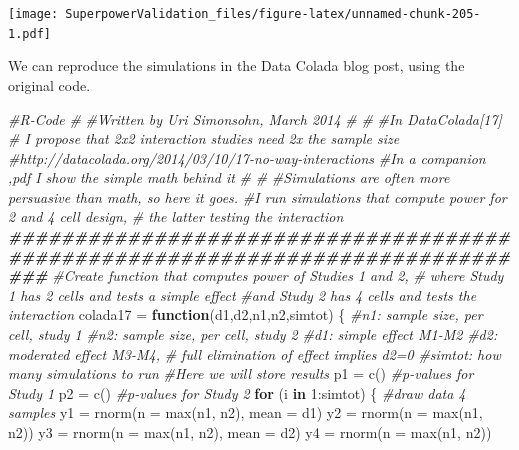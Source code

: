 \documentclass[
]{book}
\newenvironment{Shaded}{\begin{snugshade}}{\end{snugshade}}
\newcommand{\AttributeTok}[1]{\textcolor[rgb]{0.77,0.63,0.00}{#1}}
\newcommand{\CommentTok}[1]{\textcolor[rgb]{0.56,0.35,0.01}{\textit{#1}}}
\newcommand{\ControlFlowTok}[1]{\textcolor[rgb]{0.13,0.29,0.53}{\textbf{#1}}}
\newcommand{\DecValTok}[1]{\textcolor[rgb]{0.00,0.00,0.81}{#1}}
\newcommand{\DocumentationTok}[1]{\textcolor[rgb]{0.56,0.35,0.01}{\textbf{\textit{#1}}}}
\newcommand{\FunctionTok}[1]{\textcolor[rgb]{0.00,0.00,0.00}{#1}}
\newcommand{\NormalTok}[1]{#1}
\newcommand{\OtherTok}[1]{\textcolor[rgb]{0.56,0.35,0.01}{#1}}
\newcommand{\SpecialCharTok}[1]{\textcolor[rgb]{0.00,0.00,0.00}{#1}}
\begin{document}
\texttt{[image: SuperpowerValidation\_files/figure-latex/unnamed-chunk-205-1.pdf]}

We can reproduce the simulations in the Data Colada blog post, using the original code.

\begin{Shaded}
\begin{Highlighting}[]
\CommentTok{\#R{-}Code}
\CommentTok{\#}
\CommentTok{\#Written by Uri Simonsohn, March 2014}
\CommentTok{\#}
\CommentTok{\#}
\CommentTok{\#In DataColada[17] }
\CommentTok{\# I propose that 2x2 interaction studies need 2x the sample size}
\CommentTok{\#http://datacolada.org/2014/03/10/17{-}no{-}way{-}interactions}
\CommentTok{\#In a companion ,pdf I show the simple math behind it}
\CommentTok{\#}
\CommentTok{\#}
\CommentTok{\#Simulations are often more persuasive than math, so here it goes.}
\CommentTok{\#I run simulations that compute power for 2 and 4 cell design, }
\CommentTok{\# the latter testing the interaction}
\DocumentationTok{\#\#\#\#\#\#\#\#\#\#\#\#\#\#\#\#\#\#\#\#\#\#\#\#\#\#\#\#\#\#\#\#\#\#\#\#\#\#\#\#\#\#\#\#\#\#\#\#\#\#\#\#\#\#\#\#\#\#\#\#\#\#\#\#\#\#\#\#\#\#\#\#\#\#\#\#\#\#\#}
\CommentTok{\#Create function that computes power of Studies 1 and 2, }
\CommentTok{\# where Study 1  has 2 cells and tests a simple effect}
\CommentTok{\#and Study 2 has 4 cells and tests the interaction}
\NormalTok{colada17 }\OtherTok{=} \ControlFlowTok{function}\NormalTok{(d1,d2,n1,n2,simtot)}
\NormalTok{  \{}
  \CommentTok{\#n1: sample size, per cell, study 1}
  \CommentTok{\#n2: sample size, per cell, study 2}
  \CommentTok{\#d1: simple effect M1{-}M2}
  \CommentTok{\#d2: moderated effect M3{-}M4, }
  \CommentTok{\# full elimination of effect implies d2=0}
  \CommentTok{\#simtot: how many simulations to run}
  \CommentTok{\#Here we will store results}
\NormalTok{      p1 }\OtherTok{=} \FunctionTok{c}\NormalTok{()    }\CommentTok{\#p{-}values for Study 1}
\NormalTok{      p2 }\OtherTok{=} \FunctionTok{c}\NormalTok{()    }\CommentTok{\#p{-}values for Study 2}
  \ControlFlowTok{for}\NormalTok{ (i }\ControlFlowTok{in} \DecValTok{1}\SpecialCharTok{:}\NormalTok{simtot) \{}
    \CommentTok{\#draw data 4 samples}
\NormalTok{    y1 }\OtherTok{=} \FunctionTok{rnorm}\NormalTok{(}\AttributeTok{n =} \FunctionTok{max}\NormalTok{(n1, n2), }\AttributeTok{mean =}\NormalTok{ d1)}
\NormalTok{    y2 }\OtherTok{=} \FunctionTok{rnorm}\NormalTok{(}\AttributeTok{n =} \FunctionTok{max}\NormalTok{(n1, n2))}
\NormalTok{    y3 }\OtherTok{=} \FunctionTok{rnorm}\NormalTok{(}\AttributeTok{n =} \FunctionTok{max}\NormalTok{(n1, n2), }\AttributeTok{mean =}\NormalTok{ d2)}
\NormalTok{    y4 }\OtherTok{=} \FunctionTok{rnorm}\NormalTok{(}\AttributeTok{n =} \FunctionTok{max}\NormalTok{(n1, n2))}
    

\end{Highlighting}
\end{Shaded}
\end{document}
